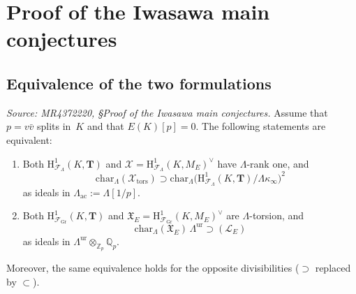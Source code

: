 \section{Proof of the Iwasawa main conjectures}

\subsection{Equivalence of the two formulations}

\begin{proposition}
  \label{prop:equiv-imc}
  \textit{Source: MR4372220, \S{}Proof of the Iwasawa main conjectures.}
  Assume that $p = v\bar{v}$ splits in~$K$ and that $E(K)[p] = 0$.
  The following statements are equivalent:
  \begin{enumerate}
    \item[(i)] Both $\mathrm{H}^1_{\mathcal{F}_\Lambda}(K, \mathbf{T})$ and
      $\mathcal{X} = \mathrm{H}^1_{\mathcal{F}_\Lambda}(K, M_E)^\vee$
      have $\Lambda$-rank one, and
      \[
        \mathrm{char}_\Lambda(\mathcal{X}_{\mathrm{tors}})
        \supset
        \mathrm{char}_\Lambda\!\bigl(\mathrm{H}^1_{\mathcal{F}_\Lambda}(K,\mathbf{T})/\Lambda\kappa_\infty\bigr)^2
      \]
      as ideals in $\Lambda_{\mathrm{ac}} := \Lambda[1/p]$.
    \item[(ii)] Both $\mathrm{H}^1_{\mathcal{F}_{\mathrm{Gr}}}(K, \mathbf{T})$
      and $\mathfrak{X}_E = \mathrm{H}^1_{\mathcal{F}_{\mathrm{Gr}}}(K, M_E)^\vee$
      are $\Lambda$-torsion, and
      \[
        \mathrm{char}_\Lambda(\mathfrak{X}_E)\,\Lambda^{\mathrm{ur}}
        \supset (\mathcal{L}_E)
      \]
      as ideals in $\Lambda^{\mathrm{ur}} \otimes_{\mathbb{Z}_p} \mathbb{Q}_p$.
  \end{enumerate}
  Moreover, the same equivalence holds for the opposite divisibilities
  ($\supset$ replaced by $\subset$).
\end{proposition}

